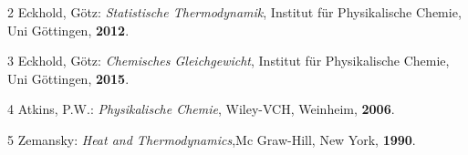 \documentclass[a4paper,12pt,oneside,onecolum,final,openany]{report}
\begin{document}
2 \quad Eckhold, Götz: \emph{Statistische Thermodynamik}, Institut für Physikalische Chemie, Uni Göttingen, \textbf{2012}.

\vspace{0,5cm}

3 \quad Eckhold, Götz: \emph{Chemisches Gleichgewicht}, Institut für Physikalische Chemie, Uni Göttingen, \textbf{2015}.\\

\vspace{0,5cm}

4 \quad Atkins, P.W.: \emph{Physikalische Chemie}, Wiley-VCH, Weinheim, \textbf{2006}.\\

\vspace{0,5cm}

5 \quad Zemansky: \emph{Heat and Thermodynamics},Mc Graw-Hill, New York, \textbf{1990}.\\
\end{document}
